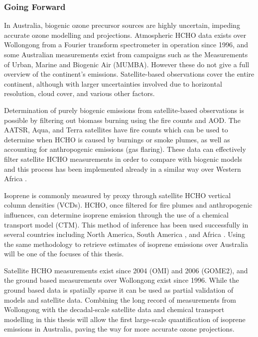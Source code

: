 \subsubsection{Going Forward}
In Australia, biogenic ozone precursor sources are highly uncertain, impeding accurate ozone modelling and projections.
Atmospheric HCHO data exists over Wollongong from a Fourier transform spectrometer in operation since 1996, and some Australian measurements exist from campaigns such as the Measurements of Urban, Marine and Biogenic Air (MUMBA).
However these do not give a full overview of the continent's emissions. Satellite-based observations cover the entire continent, although with larger uncertainties involved due to horizontal resolution, cloud cover, and various other factors. 

Determination of purely biogenic emissions from satellite-based observations is possible by filtering out biomass burning using the fire counts and AOD.
The AATSR, Aqua, and Terra satellites have fire counts which can be used to determine when HCHO is caused by burnings or smoke plumes, as well as accounting for anthropogenic emissions (gas flaring).
These data can effectively filter satellite HCHO measurements in order to compare with biogenic models and this process has been implemented already in a similar way over Western Africa \cite{Marais_2012}.

Isoprene is commonly measured by proxy through satellite HCHO vertical column densities (VCDs). HCHO, once filtered for fire plumes and anthropogenic influences, can determine isoprene emission through the use of a chemical transport model (CTM).
This method of inference has been used successfully in several countries including North America\cite{Palmer_2003}, South America \cite{Barkley_2013}, and Africa \cite{Marais_2012}.
Using the same methodology to retrieve estimates of isoprene emissions over Australia will be one of the focuses of this thesis.

Satellite HCHO measurements exist since 2004 (OMI) and 2006 (GOME2), and the ground based measurements over Wollongong exist since 1996. While the ground based data is spatially sparse it can be used as partial validation of models and satellite data. 
Combining the long record of measurements from Wollongong with the decadal-scale satellite data and chemical transport modelling in this thesis will allow the first large-scale quantification of isoprene emissions in Australia, paving the way for more accurate ozone projections.
